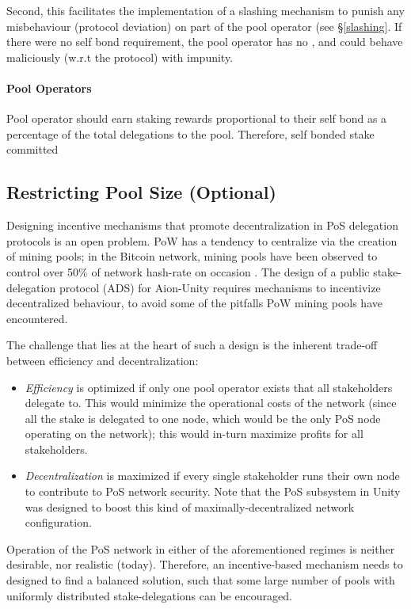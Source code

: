 Second, this facilitates the implementation of a slashing mechanism to punish any misbehaviour (protocol deviation) on part of the pool operator (see \S\ref{slashing}. If there were no self bond requirement, the pool operator has no , and could behave maliciously (w.r.t the protocol) with impunity. 

\paragraph{Pool Operators} Pool operator should earn staking rewards proportional to their self bond as a percentage of the total delegations to the pool. Therefore, self bonded stake committed 

\subsection{Restricting Pool Size (Optional)}
Designing incentive mechanisms that promote decentralization in PoS delegation protocols is an open problem. PoW has a tendency to centralize via the creation of mining pools; in the Bitcoin network, mining pools have been observed to control over 50\% of network hash-rate on occasion \cite{RJZ+19}. The design of a public stake-delegation protocol (ADS) for Aion-Unity requires mechanisms to incentivize decentralized behaviour, to avoid some of the pitfalls PoW mining pools have encountered. 

The challenge that lies at the heart of such a design is the inherent trade-off between efficiency and decentralization: 
\begin{itemize}[label=--,nosep]
    \item \textit{Efficiency} is optimized if only one pool operator exists that all stakeholders delegate to. This would minimize the operational costs of the network (since all the stake is delegated to one node, which would be the only PoS node operating on the network); this would in-turn maximize profits for all stakeholders. 
    \item \textit{Decentralization} is maximized if every single stakeholder runs their own node to contribute to PoS network security. Note that the PoS subsystem in Unity was designed to boost this kind of maximally-decentralized network configuration. 
\end{itemize}

Operation of the PoS network in either of the aforementioned regimes is neither desirable, nor realistic (today). Therefore, an incentive-based mechanism needs to designed to find a balanced solution, such that some large number of pools with uniformly distributed stake-delegations can be encouraged. 

